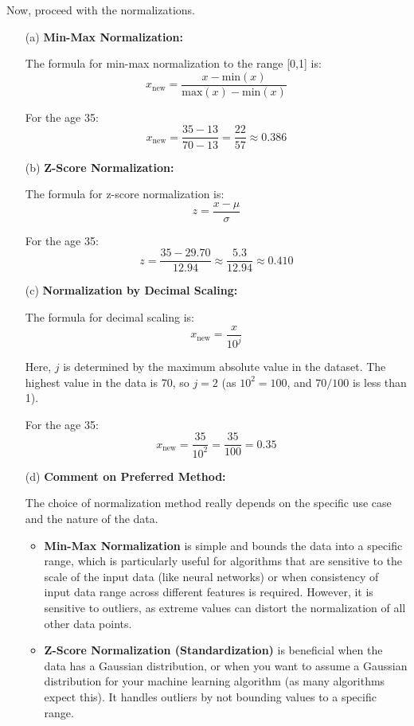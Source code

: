 \documentclass{article}
\begin{document}
\noindent Now, proceed with the normalizations.

\begin{enumerate}
  \item[(a)] \textbf{Min-Max Normalization:}

  The formula for min-max normalization to the range [0,1] is:
  \[
  x_{\text{new}} = \frac{x - \text{min}(x)}{\text{max}(x) - \text{min}(x)}
  \]

  For the age 35:
  \[
  x_{\text{new}} = \frac{35 - 13}{70 - 13} = \frac{22}{57} \approx 0.386
  \]

  \item[(b)] \textbf{Z-Score Normalization:}

  The formula for z-score normalization is:
  \[
  z = \frac{x - \mu}{\sigma}
  \]

  For the age 35:
  \[
  z = \frac{35 - 29.70}{12.94} \approx \frac{5.3}{12.94} \approx 0.410
  \]

  \item[(c)] \textbf{Normalization by Decimal Scaling:}

  The formula for decimal scaling is:
  \[
  x_{\text{new}} = \frac{x}{10^j}
  \]

  Here, $j$ is determined by the maximum absolute value in the dataset. The highest value in the data is 70, so $j = 2$ (as $10^2 = 100$, and $70/100$ is less than 1).

  For the age 35:
  \[
  x_{\text{new}} = \frac{35}{10^2} = \frac{35}{100} = 0.35
  \]

  \item[(d)] \textbf{Comment on Preferred Method:}

  The choice of normalization method really depends on the specific use case and the nature of the data.

  \begin{itemize}
    \item \textbf{Min-Max Normalization} is simple and bounds the data into a specific range, which is particularly useful for algorithms that are sensitive to the scale of the input data (like neural networks) or when consistency of input data range across different features is required. However, it is sensitive to outliers, as extreme values can distort the normalization of all other data points.

    \item \textbf{Z-Score Normalization (Standardization)} is beneficial when the data has a Gaussian distribution, or when you want to assume a Gaussian distribution for your machine learning algorithm (as many algorithms expect this). It handles outliers by not bounding values to a specific range.


\end{itemize}
\end{enumerate}
\end{document}
